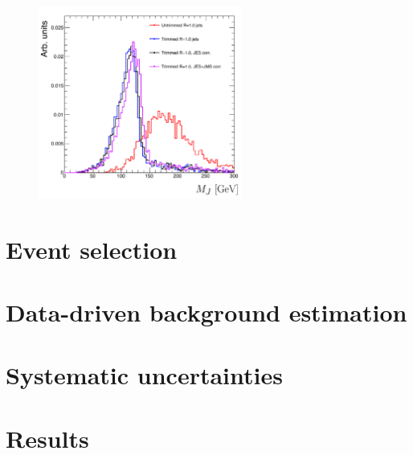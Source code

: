 \begin{figure}[h!]
  \centering
  \captionsetup{justification=centering}

  \includegraphics[width=0.6\textwidth]{figures/Trimmed_Mass}
  \caption{}
  \label{fig:trimming}
\end{figure}


\section{Event selection}

\section{Data-driven background estimation}

\section{Systematic uncertainties}

\section{Results}


